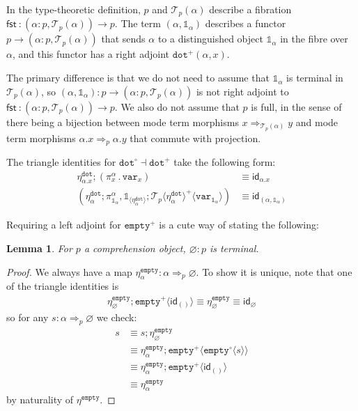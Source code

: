 \documentclass[10pt]{article}
\newtheorem{lemma}{Lemma}
\theoremstyle{definition}
\let\emptyset\varnothing
\newcommand\dsd[1]{\ensuremath{\mathsf{#1}}}
\newcommand{\tcell}{\Rightarrow}
\newcommand{\app}[2]{\ensuremath{#1 \: #2}}
\newcommand{\sigmacl}[3]{\ensuremath{(#1{:}#2,#3)}}
\newcommand{\fst}[1]{\app{\dsd{fst}}{#1}}
\newcommand{\id}{\mathsf{id}}
\newcommand\TrPlus[2]{\ensuremath{{#1}^+(#2)}}
\newcommand\El[2]{\mathcal{T}_{#1}(#2)}
\newcommand\ApEl[2]{\mathcal{T}_{#1}\langle#2\rangle}
\newcommand\bdot[0]{\mathbin{.}}
\newcommand\ApPlus[2]{\ensuremath{{#1}^+ \langle #2 \rangle }}
\newcommand\ApCirc[2]{\ensuremath{{#1}^\circ \langle #2 \rangle }}
\newcommand{\tdot}{\ensuremath{\mathtt{dot}}}
\newcommand{\tempty}{\ensuremath{\mathtt{empty}}}
\newcommand\One{\ensuremath{\mathds{1}}}
\newcommand\var[1]{\ensuremath{\mathtt{var}_{#1}}}
\newcommand\ApOne[1]{\ensuremath{\One_{\langle {#1} \rangle }}}
\begin{document}
In the type-theoretic definition, $p$ and $\El{p}{\alpha}$ describe a fibration $\fst : \sigmacl{\alpha}{p}{\El{p}{\alpha}} \to p$. The term $(\alpha, \One_\alpha)$ describes a functor $p \to \sigmacl{\alpha}{p}{\El{p}{\alpha}}$ that sends $\alpha$ to a distinguished object $\One_\alpha$ in the fibre over $\alpha$, and this functor has a right adjoint $\TrPlus{\tdot}{\alpha,x}$.

The primary difference is that we do not need to assume that $\One_\alpha$ is terminal in $\El{p}{\alpha}$, so $(\alpha, \One_\alpha) : p \to \sigmacl{\alpha}{p}{\El{p}{\alpha}}$ is not right adjoint to $\fst : \sigmacl{\alpha}{p}{\El{p}{\alpha}} \to p$. We also do not assume that $p$ is full, in the sense of there being a bijection between mode term morphisms $x \tcell_{\El{p}{\alpha}} y$ and mode term morphisms $\alpha.x \tcell_p \alpha.y$ that commute with projection.

The triangle identities for $\tdot^\circ \dashv \tdot^+$ take the following form:
\begin{align}
\label{eq:chi-triangle-1} \eta^\tdot_{\alpha.x};(\pi_x^\alpha \bdot \var{x}) &\equiv \id_{\alpha.x} \\
\label{eq:chi-triangle-2} (\eta^\tdot_\alpha ; \pi^\alpha_{\One_\alpha}, \ApOne{\eta^\tdot_\alpha} ; \ApPlus{\ApEl{p}{\eta^\tdot_\alpha}}{\var{\One_\alpha}}) &\equiv \id_{(\alpha, \One_\alpha)}
\end{align}

Requiring a left adjoint for $\tempty^+$ is a cute way of stating the following:
\begin{lemma}
For $p$ a comprehension object, $\emptyset : p$ is terminal.
\end{lemma}
\begin{proof}
We always have a map $\eta^\tempty_\alpha : \alpha \tcell_p \emptyset$. To show it is unique, note that one of the triangle identities is 
\begin{align*}
\eta^\tempty_\emptyset ; \ApPlus{\tempty}{\id_{()}} \equiv \eta^\tempty_\emptyset \equiv \id_\emptyset
\end{align*}
so for any $s : \alpha \tcell_p \emptyset$ we check:
\begin{align*}
s 
&\equiv s ; \eta^\tempty_\emptyset \\
&\equiv \eta^\tempty_\alpha ; \ApPlus{\tempty}{\ApCirc{\tempty}{s}} \\
&\equiv \eta^\tempty_\alpha ; \ApPlus{\tempty}{\id_{()}} \\
&\equiv \eta^\tempty_\alpha
\end{align*}
by naturality of $\eta^\tempty$.
\end{proof}
\end{document}
